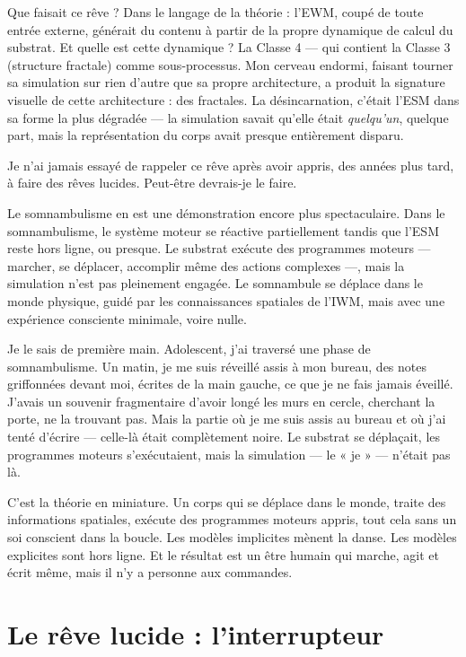 \documentclass[11pt, twoside, openright]{book}
\begin{document}
Que faisait ce rêve ? Dans le langage de la théorie : l'EWM, coupé de toute entrée externe, générait du contenu à partir de la propre dynamique de calcul du substrat. Et quelle est cette dynamique ? La Classe 4 --- qui contient la Classe 3 (structure fractale) comme sous-processus. Mon cerveau endormi, faisant tourner sa simulation sur rien d'autre que sa propre architecture, a produit la signature visuelle de cette architecture : des fractales. La désincarnation, c'était l'ESM dans sa forme la plus dégradée --- la simulation savait qu'elle était \textit{quelqu'un}, quelque part, mais la représentation du corps avait presque entièrement disparu.

Je n'ai jamais essayé de rappeler ce rêve après avoir appris, des années plus tard, à faire des rêves lucides. Peut-être devrais-je le faire.

Le somnambulisme en est une démonstration encore plus spectaculaire. Dans le somnambulisme, le système moteur se réactive partiellement tandis que l'ESM reste hors ligne, ou presque. Le substrat exécute des programmes moteurs --- marcher, se déplacer, accomplir même des actions complexes ---, mais la simulation n'est pas pleinement engagée. Le somnambule se déplace dans le monde physique, guidé par les connaissances spatiales de l'IWM, mais avec une expérience consciente minimale, voire nulle.

Je le sais de première main. Adolescent, j'ai traversé une phase de somnambulisme. Un matin, je me suis réveillé assis à mon bureau, des notes griffonnées devant moi, écrites de la main gauche, ce que je ne fais jamais éveillé. J'avais un souvenir fragmentaire d'avoir longé les murs en cercle, cherchant la porte, ne la trouvant pas. Mais la partie où je me suis assis au bureau et où j'ai tenté d'écrire --- celle-là était complètement noire. Le substrat se déplaçait, les programmes moteurs s'exécutaient, mais la simulation --- le « je » --- n'était pas là.

C'est la théorie en miniature. Un corps qui se déplace dans le monde, traite des informations spatiales, exécute des programmes moteurs appris, tout cela sans un soi conscient dans la boucle. Les modèles implicites mènent la danse. Les modèles explicites sont hors ligne. Et le résultat est un être humain qui marche, agit et écrit même, mais il n'y a personne aux commandes.

\section*{Le rêve lucide : l'interrupteur}
\end{document}
